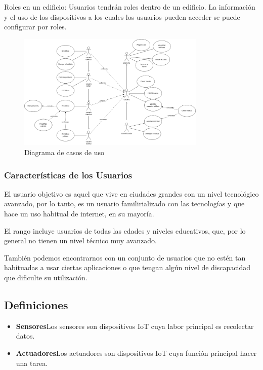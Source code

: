 \documentclass[12pt, a4paper, twoside]{article}
\newcommand\ttab{\tab \hspace{-5cm}}
\begin{document}
Roles en un edificio:
 Usuarios tendrán roles dentro de un edificio. La información y el uso de los dispositivos a los cuales
 los usuarios pueden acceder se puede configurar por roles.

\begin{figure}[h]
  \centering
  \includegraphics[width=0.8\textwidth]{UserCase.1.0.png}
  \caption{Diagrama de casos de uso}
\end{figure}

 \subsubsection{Características de los Usuarios}
 El usuario objetivo es aquel que vive en ciudades grandes con un nivel tecnológico avanzado,
 por lo tanto, es un usuario familirializado con las tecnologías y que hace un uso
 habitual de internet, en su mayoría.

 El rango incluye usuarios de todas las edades y niveles educativos, que, por lo general
 no tienen un nivel técnico muy avanzado.

 También podemos encontrarnos con un conjunto de usuarios que
 no estén tan habituadas a usar ciertas aplicaciones o que tengan algún nivel de discapacidad
 que dificulte su utilización.

\subsection{Definiciones}
\begin{itemize}
    \item \textbf{Sensores}\ttab Los sensores son dispositivos IoT cuya labor principal es recolectar datos.
    \item \textbf{Actuadores}\ttab Los actuadores son dispositivos IoT cuya función principal hacer una tarea.
\end{itemize}
\end{document}
